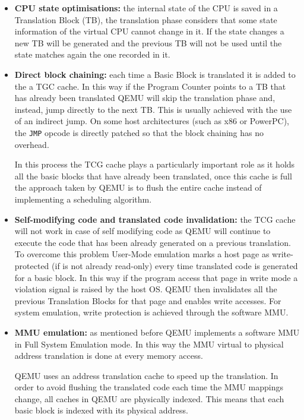 \begin{itemize}
    \item \textbf{CPU state optimisations:} the internal state of the CPU is saved in a Translation Block (TB), the translation phase considers that some state information of the virtual CPU cannot change in it. If the state changes a new TB will be generated and the previous TB will not be used until the state matches again the one recorded in it.
    
    \item \textbf{Direct block chaining:} each time a Basic Block is translated it is added to the a TGC cache. In this way if the Program Counter points to a TB that has already been translated QEMU will skip the translation phase and, instead, jump directly to the next TB. This is usually achieved with the use of an indirect jump. On some host architectures (such as x86 or PowerPC), the \lstinline{JMP} opcode is directly patched so that the block chaining has no overhead.
    
    In this process the TCG cache plays a particularly important role as it holds all the basic blocks that have already been translated, once this cache is full the approach taken by QEMU is to flush the entire cache instead of implementing a scheduling algorithm.
    
    \item \textbf{Self-modifying code and translated code invalidation:} the TCG cache will not work in case of self modifying code as QEMU will continue to execute the code that has been already generated on a previous translation. To overcome this problem User-Mode emulation marks a host page as write-protected (if is not already read-only) every time translated code is generated for a basic block. In this way if the program access that page in write mode a violation signal is raised by the host OS. QEMU then invalidates all the previous Translation Blocks for that page and enables write accesses. For system emulation, write protection is achieved through the software MMU.
    
    
    \item \textbf{MMU emulation:} as mentioned before QEMU implements a software MMU in Full System Emulation mode. In this way the MMU virtual to physical address translation is done at every memory access.

    QEMU uses an address translation cache to speed up the translation. In order to avoid flushing the translated code each time the MMU mappings change, all caches in QEMU are physically indexed. This means that each basic block is indexed with its physical address.


\end{itemize}
